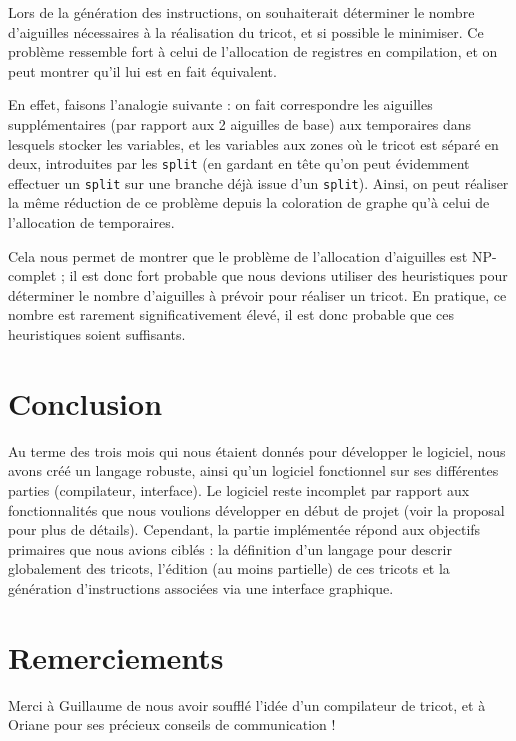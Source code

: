 \documentclass{article}
\begin{document}
Lors de la génération des instructions, on souhaiterait déterminer le nombre d'aiguilles nécessaires à la réalisation du tricot, 
et si possible le minimiser. Ce problème ressemble fort à celui de l'allocation de registres en compilation, et on peut montrer 
qu'il lui est en fait équivalent.

En effet, faisons l'analogie suivante : on fait correspondre les aiguilles supplémentaires (par rapport aux 2 aiguilles de base) 
aux temporaires dans lesquels stocker les variables, et les variables aux zones où le tricot est séparé en deux, introduites par 
les \texttt{split} (en gardant en tête qu'on peut évidemment effectuer un \texttt{split} sur une branche déjà issue d'un 
\texttt{split}). Ainsi, on peut réaliser la même réduction de ce problème depuis la coloration de graphe qu'à celui de l'allocation 
de temporaires.

Cela nous permet de montrer que le problème de l'allocation d'aiguilles est \textsc{NP}-complet ; il est donc fort probable 
que nous devions utiliser des heuristiques pour déterminer le nombre d'aiguilles à prévoir pour réaliser un tricot. En pratique,
ce nombre est rarement significativement élevé, il est donc probable que ces heuristiques soient suffisants.

\section*{Conclusion}

Au terme des trois mois qui nous étaient donnés pour développer le logiciel, nous avons créé un langage robuste, ainsi qu'un 
logiciel fonctionnel sur ses différentes parties (compilateur, interface). Le logiciel reste incomplet par rapport aux 
fonctionnalités que nous voulions développer en début de projet (voir la proposal pour plus de détails). Cependant, la partie implémentée
répond aux objectifs primaires que nous avions ciblés : 
la définition d'un langage pour descrir globalement des tricots, l'édition (au moins partielle) de ces tricots et 
la génération d'instructions associées via une interface graphique.

\section*{Remerciements}

Merci à Guillaume de nous avoir soufflé l'idée d'un compilateur de tricot, et à Oriane pour ses précieux conseils de communication !

\newpage
\end{document}
